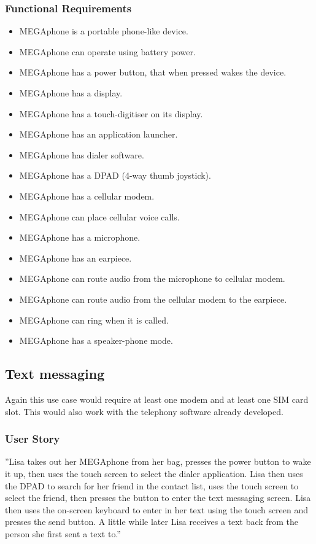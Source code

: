         \subsubsection{Functional Requirements}
        \begin{itemize}
        \item MEGAphone is a portable phone-like device.
        \item MEGAphone can operate using battery power.
        \item MEGAphone has a power button, that when pressed wakes the device.
        \item MEGAphone has a display.
        \item MEGAphone has a touch-digitiser on its display.
        \item MEGAphone has an application launcher.
        \item MEGAphone has dialer software.
        \item MEGAphone has a DPAD (4-way thumb joystick).
        \item MEGAphone has a cellular modem.
        \item MEGAphone can place cellular voice calls.
        \item MEGAphone has a microphone.
        \item MEGAphone has an earpiece.
        \item MEGAphone can route audio from the microphone to cellular modem.
        \item MEGAphone can route audio from the cellular modem to the earpiece.
        \item MEGAphone can ring when it is called.
        \item MEGAphone has a speaker-phone mode.
        \end{itemize}

\subsection{Text messaging}
	Again this use case would require at least one modem and at least one SIM card slot. This would also work with the telephony software already developed.\\

	\subsubsection{User Story}
	''Lisa takes out her MEGAphone from her bag, presses the power button to wake it up, then uses the touch screen to select the dialer application. Lisa then uses the DPAD to search for her friend in the contact list, uses the touch screen to select the friend, then presses the button to enter the text messaging screen. Lisa then uses the on-screen keyboard to enter in her text using the touch screen and presses the send button. A little while later Lisa receives a text back from the person she first sent a text to.''

